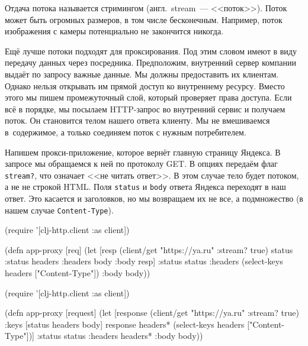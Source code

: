 Отдача потока называется стримингом (англ.~stream~--- <<поток>>). Поток может быть
огромных размеров, в том числе бесконечным. Например, поток изображения с камеры
потенциально не закончится никогда.

Ещё лучше потоки подходят для проксирования. Под этим словом имеют в виду
передачу данных через посредника. Предположим, внутренний сервер компании
выдаёт по запросу важные данные. Мы должны предоставить их клиентам. Однако
нельзя открывать им прямой доступ ко внутреннему ресурсу. Вместо этого мы пишем
промежуточный слой, который проверяет права доступа. Если всё в порядке, мы
посылаем HTTP-запрос во внутренний сервис и получаем поток. Он становится телом
нашего ответа клиенту. Мы не вмешиваемся в~содержимое, а только соединяем поток с
нужным потребителем.

Напишем прокси-приложение, которое вернёт главную страницу Яндекса. В
запросе мы обращаемся к ней по протоколу GET. В опциях передаём флаг
\verb|stream?|, что означает <<не читать ответ>>. В этом случае тело будет
потоком, а не не строкой HTML. Поля \verb|status| и \verb|body| ответа
Яндекса переходят в наш ответ. Это касается и заголовков, но мы возвращаем их не
все, а подмножество (в нашем случае \verb|Content-Type|).

\ifx\DEVICETYPE\MOBILE

\begin{english}
  \begin{clojure}
(require '[clj-http.client :as client])

(defn app-proxy [req]
  (let [resp (client/get "https://ya.ru"
                         {:stream? true})
        {status :status
         headers :headers
         body :body} resp]
    {:status status
     :headers (select-keys
                headers ["Content-Type"])
     :body body}))
  \end{clojure}
\end{english}

\else

\begin{english}
  \begin{clojure}
(require '[clj-http.client :as client])

(defn app-proxy [request]
  (let [response (client/get "https://ya.ru" {:stream? true})
        {:keys [status headers body]} response
        headers* (select-keys headers ["Content-Type"])]
    {:status status
     :headers headers*
     :body body}))
  \end{clojure}
\end{english}


